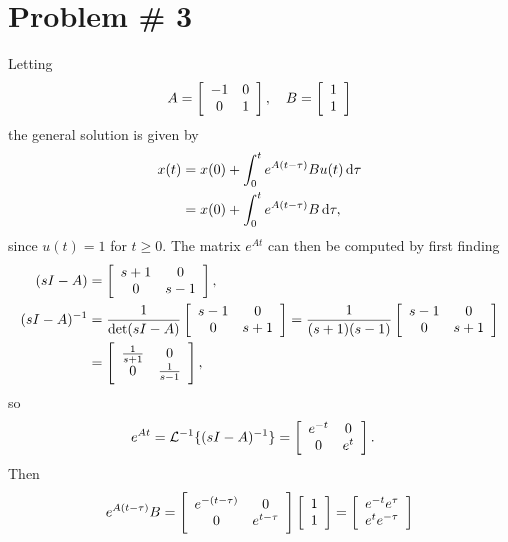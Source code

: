 \documentclass{article}
\begin{document}
\pagebreak

\section*{Problem \# 3}

Letting
$$
A = \left[\begin{array}{c c}
      -1 & 0 \\ 0 & 1
    \end{array}\right], \quad
B = \left[\begin{array}{c}
       1 \\ 1
    \end{array}\right]
$$
the general solution is given by
\begin{align*}
x(t) &= x(0) + \int_0^t e^{A(t - \tau)} Bu(t) \dif \tau \\
     &= x(0) + \int_0^t e^{A(t - \tau)} B \dif \tau,
\end{align*}
since $u(t) = 1$ for $t \geq 0$. The matrix $e^{At}$ can then be
computed by first finding
\begin{align*}
(s I - A) 
&= \left[\begin{array}{c c}
     s + 1 & 0     \\
     0     & s - 1
\end{array}\right], \\
(s I - A)^{-1} 
&= \frac{1}{\det (s I - A)}
   \left[\begin{array}{c c}
     s - 1 & 0 \\
     0     & s + 1
   \end{array}\right]
 = \frac{1}{(s+1)(s-1)}
   \left[\begin{array}{c c}
     s - 1 & 0 \\
     0     & s + 1
   \end{array}\right] \\
&=
   \left[\begin{array}{c c}
     \frac{1}{s + 1} & 0 \\
     0               & \frac{1}{s - 1}
   \end{array}\right],
\end{align*}
so
\begin{align*}
e^{A t} 
&= \mathcal{L}^{-1}\{(s I - A)^{-1}\}
 = \left[\begin{array}{c c}
     e^{-t} & 0 \\ 0 & e^{t}
   \end{array}\right].
\end{align*}
Then
$$
e^{A(t - \tau)}B 
= \left[\begin{array}{c c}
    e^{-(t - \tau)} & 0 \\ 0 & e^{t - \tau}
  \end{array}\right]
  \left[\begin{array}{c}
    1 \\ 1
  \end{array}\right]
= \left[\begin{array}{c}
    e^{-t}e^{\tau} \\ e^{t}e^{-\tau}
  \end{array}\right]
$$
\end{document}
